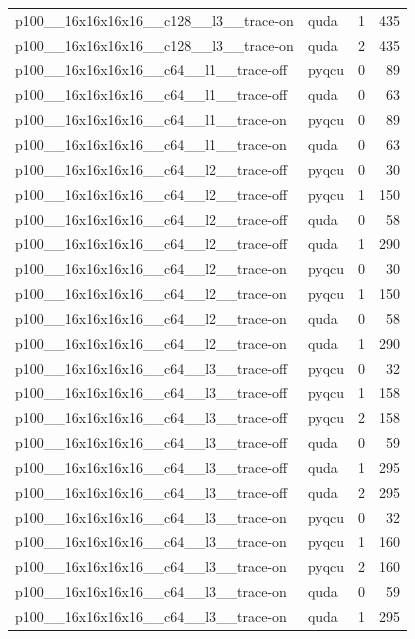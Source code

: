 \begin{table}[htbp]
\begin{tabular}{@{}llrr@{}}
p100\_\_16x16x16x16\_\_c128\_\_l3\_\_trace-on & quda & 1 & 435 \\
p100\_\_16x16x16x16\_\_c128\_\_l3\_\_trace-on & quda & 2 & 435 \\
p100\_\_16x16x16x16\_\_c64\_\_l1\_\_trace-off & pyqcu & 0 & 89 \\
p100\_\_16x16x16x16\_\_c64\_\_l1\_\_trace-off & quda & 0 & 63 \\
p100\_\_16x16x16x16\_\_c64\_\_l1\_\_trace-on & pyqcu & 0 & 89 \\
p100\_\_16x16x16x16\_\_c64\_\_l1\_\_trace-on & quda & 0 & 63 \\
p100\_\_16x16x16x16\_\_c64\_\_l2\_\_trace-off & pyqcu & 0 & 30 \\
p100\_\_16x16x16x16\_\_c64\_\_l2\_\_trace-off & pyqcu & 1 & 150 \\
p100\_\_16x16x16x16\_\_c64\_\_l2\_\_trace-off & quda & 0 & 58 \\
p100\_\_16x16x16x16\_\_c64\_\_l2\_\_trace-off & quda & 1 & 290 \\
p100\_\_16x16x16x16\_\_c64\_\_l2\_\_trace-on & pyqcu & 0 & 30 \\
p100\_\_16x16x16x16\_\_c64\_\_l2\_\_trace-on & pyqcu & 1 & 150 \\
p100\_\_16x16x16x16\_\_c64\_\_l2\_\_trace-on & quda & 0 & 58 \\
p100\_\_16x16x16x16\_\_c64\_\_l2\_\_trace-on & quda & 1 & 290 \\
p100\_\_16x16x16x16\_\_c64\_\_l3\_\_trace-off & pyqcu & 0 & 32 \\
p100\_\_16x16x16x16\_\_c64\_\_l3\_\_trace-off & pyqcu & 1 & 158 \\
p100\_\_16x16x16x16\_\_c64\_\_l3\_\_trace-off & pyqcu & 2 & 158 \\
p100\_\_16x16x16x16\_\_c64\_\_l3\_\_trace-off & quda & 0 & 59 \\
p100\_\_16x16x16x16\_\_c64\_\_l3\_\_trace-off & quda & 1 & 295 \\
p100\_\_16x16x16x16\_\_c64\_\_l3\_\_trace-off & quda & 2 & 295 \\
p100\_\_16x16x16x16\_\_c64\_\_l3\_\_trace-on & pyqcu & 0 & 32 \\
p100\_\_16x16x16x16\_\_c64\_\_l3\_\_trace-on & pyqcu & 1 & 160 \\
p100\_\_16x16x16x16\_\_c64\_\_l3\_\_trace-on & pyqcu & 2 & 160 \\
p100\_\_16x16x16x16\_\_c64\_\_l3\_\_trace-on & quda & 0 & 59 \\
p100\_\_16x16x16x16\_\_c64\_\_l3\_\_trace-on & quda & 1 & 295 \\

\end{tabular}
\end{table}
